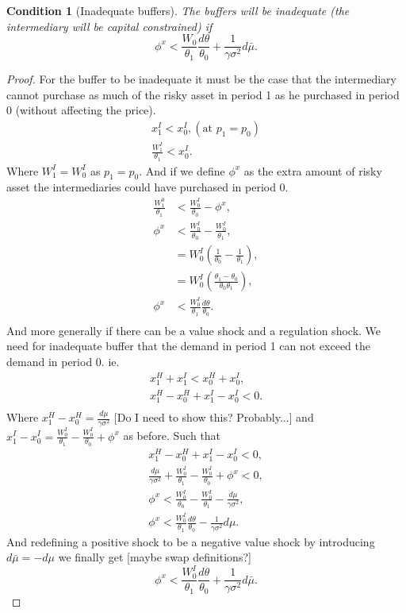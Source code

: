\documentclass[11pt]{article}
\newtheorem{condition}{Condition}
\begin{document}
\begin{condition}[Inadequate buffers] \label{c_inadequateBuffers}
The buffers will be inadequate (the intermediary will be capital constrained) if 
\begin{equation}
\phi^x < \frac{W_0}{\theta_1}\frac{d\theta}{\theta_0}+\frac{1}{\gamma\sigma^2}d\bar{\mu}.
\end{equation}
\end{condition}
\begin{proof}
For the buffer to be inadequate it must be the case that the intermediary cannot purchase as much of the risky asset in period 1 as he purchased in period 0 (without affecting the price).
\begin{align*}
x^I_1 < x^I_0, (\text{at } p_1 = p_0)\\
\frac{W^I_1}{\theta_1} < x^I_0.
\end{align*}
Where $W^I_1 = W^I_0$ as $p_1 = p_0$. And if we define $\phi^x$ as the extra amount of risky asset the intermediaries could have purchased in period 0.
\begin{align*}
\frac{W^0_1}{\theta_1} &< \frac{W^I_0}{\theta_0} - \phi^x,\\
\phi^x &< \frac{W^I_0}{\theta_0} - \frac{W^I_0}{\theta_1},\\
&= W^I_0 \left(\frac{1}{\theta_0} - \frac{1}{\theta_1}\right),\\
&= W^I_0 \left(\frac{\theta_1 - \theta_0}{\theta_0 \theta_1}\right),\\
\phi^x &< \frac{W^I_0}{\theta_1} \frac{d\theta}{\theta_0}.\\
\end{align*}
And more generally if there can be a value shock and a regulation shock. We need for inadequate buffer that the demand in period 1 can not exceed the demand in period 0. ie.
\begin{align*}
x^H_1 + x^I_1 < x^H_0 + x^I_0,\\
x^H_1 - x^H_0 + x^I_1 - x^I_0 < 0.\\
\end{align*}
Where $x^H_1 - x^H_0 = \frac{d\mu}{\gamma\sigma^2}$ [Do I need to show this? Probably...] and $x^I_1 - x^I_0 = \frac{W^I_0}{\theta_1} - \frac{W^I_0}{\theta_0} + \phi^x$ as before. Such that
\begin{align*}
x^H_1 - x^H_0 + x^I_1 - x^I_0 < 0,\\
\frac{d\mu}{\gamma\sigma^2} + \frac{W^I_0}{\theta_1} - \frac{W^I_0}{\theta_0} + \phi^x < 0,\\
\phi^x < \frac{W^I_0}{\theta_0} - \frac{W^I_0}{\theta_1} - \frac{d\mu}{\gamma\sigma^2},\\
\phi^x < \frac{W^I_0}{\theta_1} \frac{d\theta}{\theta_0} - \frac{1}{\gamma\sigma^2}d\mu.
\end{align*}
And redefining a positive shock to be a negative value shock by introducing $d\bar{\mu} = -d\mu$ we finally get [maybe swap definitions?]
\begin{equation}
\phi^x < \frac{W^I_0}{\theta_1} \frac{d\theta}{\theta_0} + \frac{1}{\gamma\sigma^2}d\bar{\mu}.
\end{equation} 
\end{proof}
\end{document}
